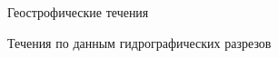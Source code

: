 \begin{chapter}{Геострофические течения}
\begin{section}{Течения по данным гидрографических разрезов}


\end{section}
\end{chapter}
